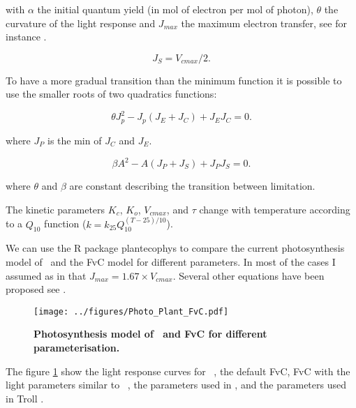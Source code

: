 \documentclass[a4paper,11pt]{article}
\begin{document}
with $\alpha$ the initial quantum yield (in mol of electron per mol of photon), $\theta$ the curvature of the light response and $J_{max}$ the maximum electron transfer,
see for instance \citet{Bernacchi-2009}.


\begin{equation}
\label{eq:JS}
J_S= V_{cmax}/2.
\end{equation}

To have a more gradual transition than the minimum function it is possible to use the smaller roots of two quadratics functions:

\begin{equation}
\label{eq:Q1}
\theta J_p^2 - J_p(J_E+J_C) + J_E J_C= 0.
\end{equation}

where $J_P$ is the min of $J_C$ and $J_E$.

\begin{equation}
\label{eq:Q2}
\beta A^2 - A(J_P+J_S) + J_P J_S= 0.
\end{equation}

where $\theta$ and $\beta$ are constant describing the transition between limitation.

The kinetic parameters $K_c$, $K_o$, $V_{cmax}$, and $\tau$ change with temperature according to a $Q_{10}$ function ($k = k_{25} Q_{10}^{(T-25)/10}$).

\clearpage

We can use the R package plantecophys \citep{Duursma-2015} to compare
the current photosynthesis model of \plant\ and the FvC model for
different parameters. In most of the cases I assumed as in
\citet{Medlyn-2002} that $J_{max} = 1.67 \times V_{cmax}$. Several
other equations have been proposed see
\citet{Walker-2014,Kattge-2011}.


\begin{figure}[ht]
\centering
\texttt{[image: ../figures/Photo\_Plant\_FvC.pdf]}
\caption{\textbf{Photosynthesis model of \plant\ and FvC for different parameterisation.}
\label{fig:photo}}
\end{figure}

The figure \ref{fig:photo} show the light response curves for \plant\
, the default FvC, FvC with the light parameters similar to \plant\ , the parameters used in \citet{Sterck-2011}, and the parameters used in Troll \citep{Marechaux-2017}.
\end{document}
